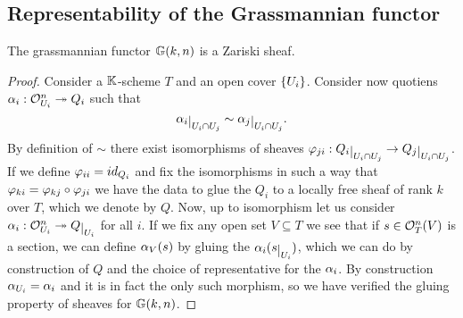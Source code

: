 \subsection{Representability of the Grassmannian functor}
\begin{proposition}
The grassmannian functor $\mathbb{G}(k,n)$ is a Zariski sheaf.
\end{proposition}
\begin{proof}
Consider a $\mathbb{K}$-scheme $T$ and an open cover $\left\{{U_i}\right\}$. Consider now quotiens $\alpha_i:\mathcal{O}_{U_i}^n\twoheadrightarrow Q_i$ such that 
\[\al_i\res{U_i\cap U_j}\sim \al_j\res{U_i\cap U_j}.\]	
By definition of $\sim$ there exist isomorphisms of sheaves $\vp_{ji}:Q_i\res{U_{i}\cap U_j}\to Q_j\res{U_i\cap U_j}$. If we define $\varphi_{ii}=id_{Q_i}$ and fix the isomorphisms in such a way that $\varphi_{ki}=\varphi_{kj}\circ \varphi_{ji}$ we have the data to glue the $Q_i$ to a locally free sheaf of rank $k$ over $T$, which we denote by $Q$. Now, up to isomorphism let us consider $\al_i:\Oc_{U_i}^n\onto Q\res{U_i}$ for all $i$. If we fix any open set $V\subseteq T$ we see that if $s\in \mathcal{O}_T^n(V)$ is a section, we can define $\alpha_V(s)$ by gluing the $\al_i(s\res{U_i})$, which we can do by construction of $Q$ and the choice of representative for the $\alpha_i$. By construction $\alpha_{U_i}=\alpha_i$ and it is in fact the only such morphism, so we have verified the gluing property of sheaves for $\mathbb{G}(k,n)$.
\end{proof}

